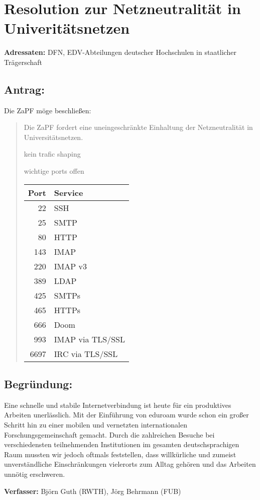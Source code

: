 \documentclass[12pt,oneside]{scrartcl}
\begin{document}
\section*{Resolution zur Netzneutralität in Univeritätsnetzen}

\textbf{Adressaten:} DFN, EDV-Abteilungen deutscher Hochschulen in staatlicher Trägerschaft

\subsection*{Antrag:}
Die ZaPF möge beschließen:
\begin{quote}
Die ZaPF fordert eine uneingeschränkte Einhaltung der Netzneutralität in Universitätsnetzen.

kein trafic shaping

wichtige ports offen

\begin{tabular}{rl}
	\toprule
	Port & Service \\
	\midrule
	22 & SSH \\
	25 & SMTP \\
	80 & HTTP \\
	143 & IMAP \\
	220 & IMAP v3 \\
	389 & LDAP \\
	425 & SMTPs \\
	465 & HTTPs \\
	666 & Doom \\
	993 & IMAP via TLS/SSL \\
	6697 & IRC via TLS/SSL \\
	\bottomrule
\end{tabular}
\end{quote}

\subsection*{Begründung:}

Eine schnelle und stabile Internetverbindung ist heute für ein produktives Arbeiten unerlässlich. Mit der Einführung von eduroam wurde schon ein großer Schritt hin zu einer mobilen und vernetzten internationalen Forschungsgemeinschaft gemacht. Durch die zahlreichen Besuche bei verschiedensten teilnehmenden Institutionen im gesamten deutschsprachigen Raum mussten wir jedoch oftmals feststellen, dass willkürliche und zumeist unverständliche Einschränkungen vielerorts zum Alltag gehören und das Arbeiten unnötig erschweren.

\vspace{1cm}
\textbf{Verfasser:} Björn Guth (RWTH), Jörg Behrmann (FUB)
\end{document}
